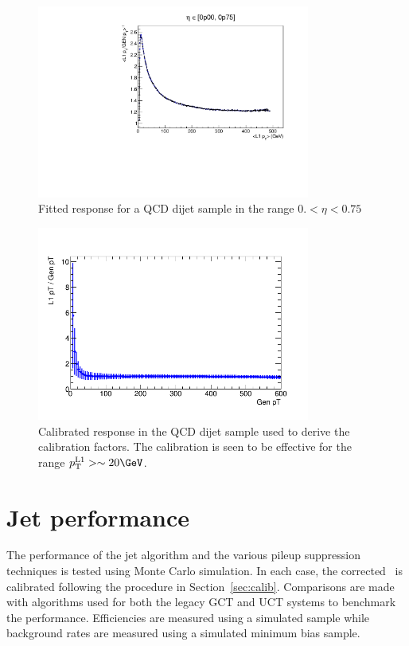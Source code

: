\begin{figure}
\centering
    \includegraphics[width=0.8\textwidth]{./Figures/triggerUpgrade/calibrationSeed5Chunky}
  \caption{
  Fitted response for a QCD dijet sample in the range $0. < \eta < 0.75$ }
  \label{fig:response}
\end{figure}

\begin{figure}
\centering
    \includegraphics[width=0.8\textwidth]{./Figures/triggerUpgrade/calib_s5_chunky}
  \caption{Calibrated response in the QCD dijet sample used to derive the calibration factors. The calibration is seen to be 
  effective for the range $\Lonept > \sim 20\GeV$.}
  \label{fig:closure_response}
\end{figure}

\section{Jet performance}
\label{sec:trig_perf}
The performance of the jet algorithm and the various pileup suppression techniques is tested using
Monte Carlo simulation. In each case, the corrected \Lonept~is calibrated following the procedure in Section~\ref{sec:calib}.
Comparisons are made with algorithms used for both the legacy GCT and UCT systems to benchmark the performance.
Efficiencies are measured using a simulated \ttbar sample while 
background rates are measured using a simulated minimum bias sample.

